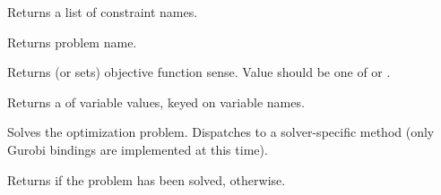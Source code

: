 \documentclass[letterpaper,10pt,english]{sphinxmanual}
\begin{document}
\begin{fulllineitems}
\begin{fulllineitems}
\end{fulllineitems}


\begin{fulllineitems}
\label{\detokenize{opt:opt.Problem.constraint_names}}
Returns a list of constraint names.

\end{fulllineitems}


\begin{fulllineitems}
\label{\detokenize{opt:opt.Problem.name}}
Returns problem name.

\end{fulllineitems}


\begin{fulllineitems}
\label{\detokenize{opt:opt.Problem.sense}}
Returns (or sets) objective function sense. Value should be one of  or .

\end{fulllineitems}


\begin{fulllineitems}
\label{\detokenize{opt:opt.Problem.solution}}
Returns a  of variable values, keyed on variable names.

\end{fulllineitems}


\begin{fulllineitems}
\label{\detokenize{opt:opt.Problem.solve}}
Solves the optimization problem. Dispatches to a solver-specific method (only Gurobi bindings are implemented at this time).

\end{fulllineitems}


\begin{fulllineitems}
\label{\detokenize{opt:opt.Problem.solved}}
Returns  if the problem has been solved,  otherwise.


\end{fulllineitems}
\end{fulllineitems}
\end{document}
